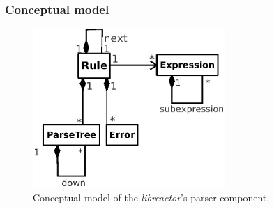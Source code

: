 \subsubsection{Conceptual model}
\begin{figure}[h]
  \centering
  \includegraphics[width=0.65\textwidth,keepaspectratio]{img/parsercm}
  \caption{Conceptual model of the \emph{libreactor}'s parser component.}
  \label{fig:parsercm}
\end{figure}
